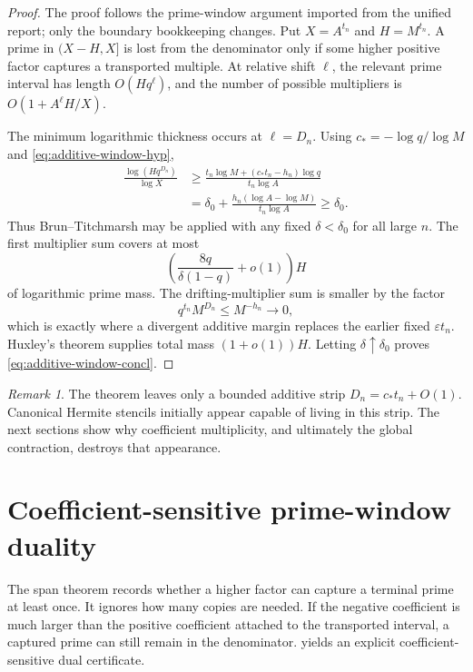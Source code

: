 \documentclass[11pt,oneside]{article}
\theoremstyle{definition}
\theoremstyle{remark}
\newtheorem{remark}[theorem]{Remark}
\newcommand{\cstar}{c_{\!*}}
\begin{document}
\begin{proof}
The proof follows the prime-window argument imported from the unified report; only the
boundary bookkeeping changes.  Put $X=A^{t_n}$ and $H=M^{t_n}$.  A prime in $(X-H,X]$ is
lost from the denominator only if some higher positive factor captures a transported
multiple.  At relative shift $\ell$, the relevant prime interval has length
$O(Hq^\ell)$, and the number of possible multipliers is
$O(1+A^\ell H/X)$.

The minimum logarithmic thickness occurs at $\ell=D_n$.  Using
$\cstar=-\log q/\log M$ and \eqref{eq:additive-window-hyp},
\begin{align*}
 \frac{\log(Hq^{D_n})}{\log X}
 &\ge \frac{t_n\log M+(\cstar t_n-h_n)\log q}{t_n\log A}\\
 &=\delta_0+\frac{h_n(\log A-\log M)}{t_n\log A}
 \ge\delta_0.
\end{align*}
Thus Brun--Titchmarsh may be applied with any fixed $\delta<\delta_0$ for all large $n$.
The first multiplier sum covers at most
\[
 \left(\frac{8q}{\delta(1-q)}+o(1)\right)H
\]
of logarithmic prime mass.  The drifting-multiplier sum is smaller by the factor
\[
 q^{t_n}M^{D_n}\le M^{-h_n}\longrightarrow0,
\]
which is exactly where a divergent additive margin replaces the earlier fixed
$\varepsilon t_n$.  Huxley's theorem supplies total mass $(1+o(1))H$.  Letting
$\delta\uparrow\delta_0$ proves \eqref{eq:additive-window-concl}.
\end{proof}

\begin{remark}
The theorem leaves only a bounded additive strip
$D_n=\cstar t_n+O(1)$.  Canonical Hermite stencils initially appear capable of living in this
strip.  The next sections show why coefficient multiplicity, and ultimately the global
contraction, destroys that appearance.
\end{remark}

\section{Coefficient-sensitive prime-window duality}
\label{sec:coefficient-dual}

The span theorem records whether a higher factor can capture a terminal prime at least once.
It ignores how many copies are needed.  If the negative coefficient is much larger than the
positive coefficient attached to the transported interval, a captured prime can still remain
in the denominator.   yields an explicit coefficient-sensitive
dual certificate.
\end{document}
